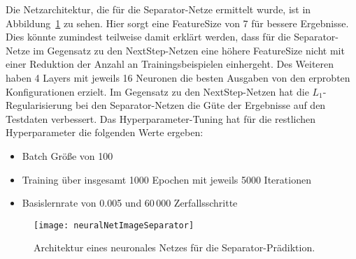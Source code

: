Die Netzarchitektur, die für die Separator-Netze  ermittelt wurde, ist in Abbildung~\ref{fig:netArchitectureSep} zu sehen.
Hier sorgt eine FeatureSize von 7 für bessere Ergebnisse.
Dies könnte zumindest teilweise damit erklärt werden, dass für die Separator-Netze im Gegensatz zu den NextStep-Netzen eine höhere FeatureSize nicht mit einer Reduktion der Anzahl an Trainingsbeispielen einhergeht.
Des Weiteren haben 4 Layers mit jeweils 16 Neuronen die besten Ausgaben von den erprobten Konfigurationen erzielt.
Im Gegensatz zu den NextStep-Netzen hat die \(L_1\)-Regularisierung bei den Separator-Netzen die Güte der Ergebnisse auf den Testdaten verbessert.  
Das Hyperparameter-Tuning hat für die restlichen Hyperparameter die folgenden Werte ergeben:
\begin{itemize}
    \item Batch Größe von 100
    \item Training über insgesamt 1000 Epochen mit jeweils 5000 Iterationen
    \item Basislernrate von 0.005 und 60\,000 Zerfallsschritte
\end{itemize}

% 

\begin{figure}[h]
    \centering
	\texttt{[image: neuralNetImageSeparator]}
	\caption{Architektur eines neuronales Netzes für die Separator-Prädiktion.}
	\label{fig:netArchitectureSep}
\end{figure}


